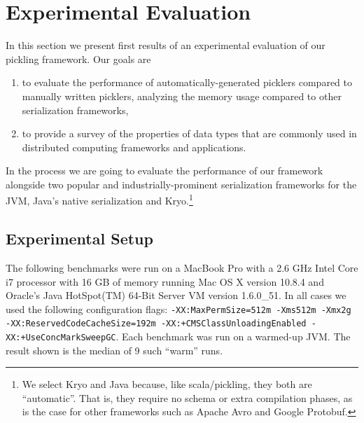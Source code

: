 \documentclass[preprint,10pt]{sigplanconf}
\theoremstyle{definition}
\theoremstyle{definition}
\begin{document}
\section{Experimental Evaluation}
\label{sec:evaluation}

In this section we present first results of an experimental evaluation
of our pickling framework. Our goals are
\begin{enumerate}
\item to evaluate the performance of automatically-generated picklers
  compared to manually written picklers, analyzing the memory usage
  compared to other serialization frameworks,
\item to provide a survey of the properties of data types that are
  commonly used in distributed computing frameworks and applications.
\end{enumerate}\noindent
In the process we are going to evaluate the performance of our
framework alongside two popular and industrially-prominent serialization frameworks
for the JVM, Java's native serialization and Kryo.\footnote{We select Kryo and Java because, like scala/pickling, they both are ``automatic''. That is, they require no schema or extra compilation phases, as is the case for other frameworks such as Apache Avro and Google Protobuf.}

\subsection{Experimental Setup}

The following benchmarks were run on a MacBook Pro with a 2.6 GHz
Intel Core i7 processor with 16 GB of memory running Mac OS X version
10.8.4 and Oracle's Java HotSpot(TM) 64-Bit Server VM version
1.6.0\_51. In all cases we used the following configuration flags:
\texttt{-XX:MaxPermSize=512m -Xms512m -Xmx2g -XX:ReservedCodeCacheSize=192m -XX:+CMSClassUnloadingEnabled -XX:+UseConcMarkSweepGC}. Each benchmark was run on a warmed-up JVM. The result shown is the median of 9 such ``warm'' runs.
\end{document}
